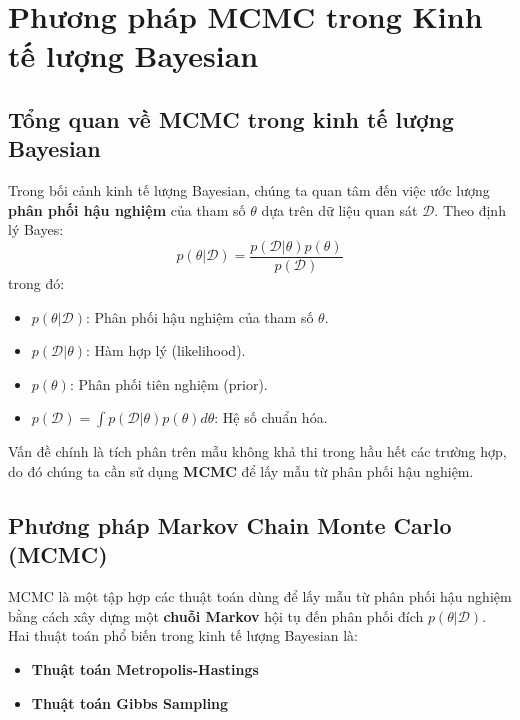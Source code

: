 \chapter{Phương pháp MCMC trong Kinh tế lượng Bayesian}
\section{Tổng quan về MCMC trong kinh tế lượng Bayesian}
Trong bối cảnh kinh tế lượng Bayesian, chúng ta quan tâm đến việc ước lượng \textbf{phân phối hậu nghiệm} của tham số $\theta$ dựa trên dữ liệu quan sát $\mathcal{D}$. Theo định lý Bayes:
\begin{equation}
    p(\theta | \mathcal{D}) = \frac{p(\mathcal{D} | \theta) p(\theta)}{p(\mathcal{D})}
\end{equation}
trong đó:
\begin{itemize}
    \item $p(\theta | \mathcal{D})$: Phân phối hậu nghiệm của tham số $\theta$.
    \item $p(\mathcal{D} | \theta)$: Hàm hợp lý (likelihood).
    \item $p(\theta)$: Phân phối tiên nghiệm (prior).
    \item $p(\mathcal{D}) = \int p(\mathcal{D} | \theta) p(\theta) d\theta$: Hệ số chuẩn hóa.
\end{itemize}
Vấn đề chính là tích phân trên mẫu không khả thi trong hầu hết các trường hợp, do đó chúng ta cần sử dụng \textbf{MCMC} để lấy mẫu từ phân phối hậu nghiệm.

\section{Phương pháp Markov Chain Monte Carlo (MCMC)}
MCMC là một tập hợp các thuật toán dùng để lấy mẫu từ phân phối hậu nghiệm bằng cách xây dựng một \textbf{chuỗi Markov} hội tụ đến phân phối đích $p(\theta | \mathcal{D})$. Hai thuật toán phổ biến trong kinh tế lượng Bayesian là:
\begin{itemize}
    \item \textbf{Thuật toán Metropolis-Hastings}
    \item \textbf{Thuật toán Gibbs Sampling}
\end{itemize}

